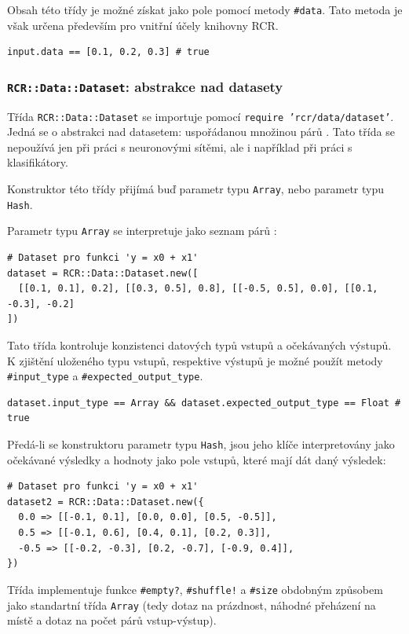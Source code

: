 \documentclass[a4paper]{article}
\begin{document}
Obsah této třídy je možné získat jako pole pomocí metody \texttt{\#data}.
Tato metoda je však určena především pro vnitřní účely knihovny RCR.
\begin{lstlisting}
input.data == [0.1, 0.2, 0.3] # true
\end{lstlisting}

\subsubsection{\texttt{RCR::Data::Dataset}: abstrakce nad datasety}
Třída \texttt{RCR::Data::Dataset} se importuje pomocí \texttt{require
'rcr/data/dataset'}. Jedná se o abstrakci nad datasetem: uspořádanou
množinou párů . Tato třída se nepoužívá jen
při práci s neuronovými sítěmi, ale i například při práci s klasifikátory.

Konstruktor této třídy přijímá buď parametr typu \texttt{Array}, nebo parametr
typu \texttt{Hash}.

Parametr typu \texttt{Array} se interpretuje jako seznam
párů :
\begin{lstlisting}
# Dataset pro funkci 'y = x0 + x1'
dataset = RCR::Data::Dataset.new([
  [[0.1, 0.1], 0.2], [[0.3, 0.5], 0.8], [[-0.5, 0.5], 0.0], [[0.1, -0.3], -0.2]
])
\end{lstlisting}

Tato třída kontroluje konzistenci datových typů vstupů a očekávaných výstupů.
K zjištění uloženého typu vstupů, respektive výstupů je možné použít metody
\texttt{\#input\_type} a \texttt{\#expected\_output\_type}.
\begin{lstlisting}
dataset.input_type == Array && dataset.expected_output_type == Float # true
\end{lstlisting}

Předá-li se konstruktoru parametr typu \texttt{Hash}, jsou jeho
klíče interpretovány jako očekávané výsledky a hodnoty jako
pole vstupů, které mají dát daný výsledek:
\begin{lstlisting}
# Dataset pro funkci 'y = x0 + x1'
dataset2 = RCR::Data::Dataset.new({
  0.0 => [[-0.1, 0.1], [0.0, 0.0], [0.5, -0.5]],
  0.5 => [[-0.1, 0.6], [0.4, 0.1], [0.2, 0.3]],
  -0.5 => [[-0.2, -0.3], [0.2, -0.7], [-0.9, 0.4]],
})
\end{lstlisting}

Třída implementuje funkce \texttt{\#empty?}, \texttt{\#shuffle!} a
\texttt{\#size} obdobným způsobem jako standartní třída \texttt{Array}
(tedy dotaz na prázdnost, náhodné přeházení na místě a dotaz na počet párů
vstup-výstup).
\end{document}
